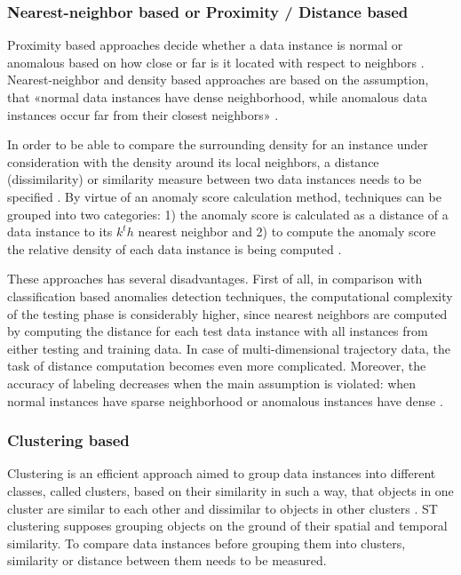 \subsubsection{Nearest-neighbor based \cite{article:15_survey_ad} or Proximity / Distance based \cite{article:6_survey_anom_det_rtuvs}\cite{inproceedings:18_ardod_lstd}}
Proximity based approaches decide whether a data instance is normal or anomalous based on how close or far is it located with respect to neighbors \cite{article:6_survey_anom_det_rtuvs}. Nearest-neighbor and density based approaches are based on the assumption, that «normal data instances have dense neighborhood, while anomalous data instances occur far from their closest neighbors» \cite{article:15_survey_ad}.

In order to be able to compare the surrounding density for an instance under consideration with the density around its local neighbors, a distance (dissimilarity) or similarity measure between two data instances needs to be specified \cite{inproceedings:18_ardod_lstd}. By virtue of an anomaly score calculation method, techniques can be grouped into two categories: 1) the anomaly score is calculated as a distance of a data instance to its $k^th$ nearest neighbor and 2) to compute the anomaly score the relative density of each data instance is being computed \cite{article:15_survey_ad}.

These approaches has several disadvantages. First of all, in comparison with classification based anomalies detection techniques, the computational complexity of the testing phase is considerably higher, since nearest neighbors are computed by computing the distance for each test data instance with all instances from either testing and training data. In case of multi-dimensional trajectory data, the task of distance computation becomes even more complicated. Moreover, the accuracy of labeling decreases when the main assumption is violated: when normal instances have sparse neighborhood or anomalous instances have dense \cite{article:15_survey_ad}.

\subsubsection{Clustering based}
Clustering is an efficient approach aimed to group data instances into different classes, called clusters, based on their similarity in such a way, that objects in one cluster are similar to each other and dissimilar to objects in other clusters \cite{article:8_review_mot_cl_alg}\cite{article:22_survey_dscc}. ST clustering supposes grouping objects on the ground of their spatial and temporal similarity. To compare data instances before grouping them into clusters, similarity or distance between them needs to be measured.

